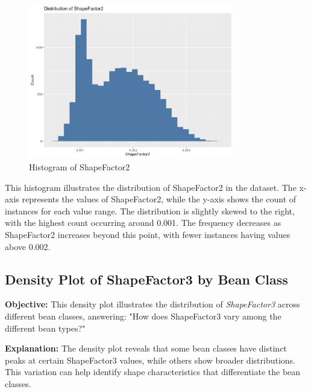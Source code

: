\documentclass[a4paper,12pt]{article}
\begin{document}
\begin{figure}[H]
    \centering
    \includegraphics[width=0.8\textwidth]{graphs/histogram_shapefactor2.png}
    \caption{Histogram of ShapeFactor2}
    \label{fig:histogram_shapefactor2}
\end{figure}
This histogram illustrates the distribution of ShapeFactor2 in the dataset. The x-axis represents the values of ShapeFactor2, while the y-axis shows the count of instances for each value range. The distribution is slightly skewed to the right, with the highest count occurring around 0.001. The frequency decreases as ShapeFactor2 increases beyond this point, with fewer instances having values above 0.002. 

\newpage

\subsection{Density Plot of ShapeFactor3 by Bean Class}
\noindent\textbf{Objective:} This density plot illustrates the distribution of \textit{ShapeFactor3} across different bean classes, answering: "How does ShapeFactor3 vary among the different bean types?"

\noindent\textbf{Explanation:} The density plot reveals that some bean classes have distinct peaks at certain ShapeFactor3 values, while others show broader distributions. This variation can help identify shape characteristics that differentiate the bean classes.
\end{document}
